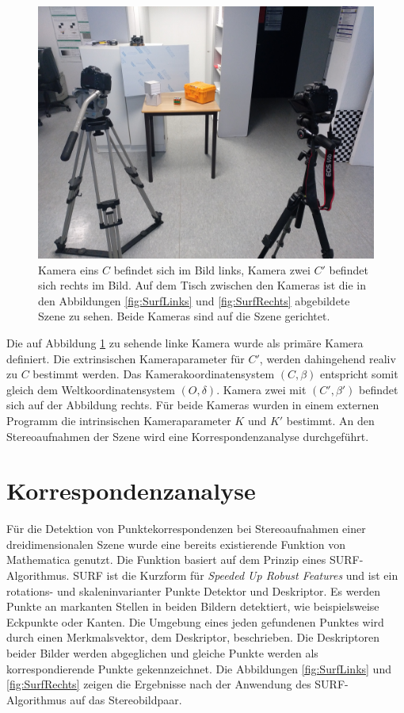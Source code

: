 \begin{figure}[!htb]
	\centering
	\includegraphics[width=.7\linewidth]{images/SetUpSameResolution.jpg}
	\caption[Stereoaufbau im Überblick]{Kamera eins $C$ befindet sich im Bild links, Kamera zwei $C'$ befindet sich rechts im Bild. Auf dem Tisch zwischen den Kameras ist die in den Abbildungen \ref{fig:SurfLinks} und \ref{fig:SurfRechts} abgebildete Szene zu sehen. Beide Kameras sind auf die Szene gerichtet.}
	\label{fig:StereoaufbauReal}
\end{figure}


Die auf Abbildung \ref{fig:StereoaufbauReal} zu sehende linke Kamera wurde als primäre Kamera definiert. Die extrinsischen Kameraparameter für $C'$, werden dahingehend realiv zu $C$ bestimmt werden. Das Kamerakoordinatensystem $(C,\beta)$ entspricht somit gleich dem Weltkoordinatensystem $(O,\delta)$. Kamera zwei mit $(C',\beta')$ befindet sich auf der Abbildung rechts. Für beide Kameras wurden in einem externen Programm die intrinsischen Kameraparameter $K$ und $K'$ bestimmt. An den Stereoaufnahmen der Szene wird eine Korrespondenzanalyse durchgeführt.   

\section{Korrespondenzanalyse}


Für die Detektion von Punktekorrespondenzen bei Stereoaufnahmen einer dreidimensionalen Szene wurde eine bereits existierende Funktion von Mathematica genutzt\cite{Mathematica}. Die Funktion basiert auf dem Prinzip eines SURF-Algorithmus. SURF ist die Kurzform für \textit{Speeded Up Robust Features} und ist ein rotations- und skaleninvarianter Punkte Detektor und Deskriptor\cite{SURF,SIFTSURF}. Es werden Punkte an markanten Stellen in beiden Bildern detektiert, wie beispielsweise Eckpunkte oder Kanten. Die Umgebung eines jeden gefundenen Punktes wird durch einen Merkmalsvektor, dem Deskriptor, beschrieben. Die Deskriptoren beider Bilder werden abgeglichen und gleiche Punkte werden als korrespondierende Punkte gekennzeichnet\cite{SURF,SIFTSURF}. Die Abbildungen \ref{fig:SurfLinks} und \ref{fig:SurfRechts} zeigen die Ergebnisse nach der Anwendung des SURF-Algorithmus auf das Stereobildpaar.



